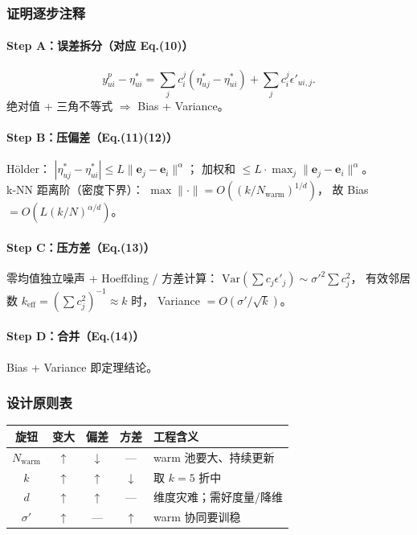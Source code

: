 \documentclass[11pt,a4paper]{ctexart}
\begin{document}
\subsubsection{证明逐步注释}
\paragraph{Step A：误差拆分（对应 Eq.(10)）}
\[
y^{p}_{ui}-\eta^*_{ui}
=
\sum_{j}c_i^{j}(\eta^*_{uj}-\eta^*_{ui})
+\sum_{j}c_i^{j}\epsilon'_{ui,j}.
\]
绝对值 + 三角不等式 $\Rightarrow$ Bias + Variance。

\paragraph{Step B：压偏差（Eq.(11)(12)）}
Hölder：
$|\eta^*_{uj}-\eta^*_{ui}|\le L\|\mathbf{e}_j-\mathbf{e}_i\|^{\alpha}$；
加权和 $\le L\cdot\max_j\|\mathbf{e}_j-\mathbf{e}_i\|^{\alpha}$。\\
k-NN 距离阶（密度下界）：
$\max\|\cdot\|=O((k/N_{\mathrm{warm}})^{1/d})$，
故 Bias $=O(L(k/N)^{\alpha/d})$。

\paragraph{Step C：压方差（Eq.(13)）}
零均值独立噪声 + Hoeffding / 方差计算：
$\mathrm{Var}(\sum c_j\epsilon'_j)\sim\sigma'^2\sum c_j^2$，
有效邻居数 $k_{\mathrm{eff}}=(\sum c_j^2)^{-1}\approx k$ 时，
Variance $=O(\sigma'/\sqrt{k})$。

\paragraph{Step D：合并（Eq.(14)）}
Bias + Variance 即定理结论。

\subsubsection{设计原则表}
\begin{center}
\small
\begin{tabular}{ccccp{5.5cm}}
\toprule
旋钮 & 变大 & 偏差 & 方差 & 工程含义 \\
\midrule
$N_{\mathrm{warm}}$ & $\uparrow$ & $\downarrow$ & — & warm 池要大、持续更新 \\
$k$ & $\uparrow$ & $\uparrow$ & $\downarrow$ & 取 $k=5$ 折中 \\
$d$ & $\uparrow$ & $\uparrow$ & — & 维度灾难；需好度量/降维 \\
$\sigma'$ & $\uparrow$ & — & $\uparrow$ & warm 协同要训稳 \\
\bottomrule
\end{tabular}
\end{center}
\end{document}
